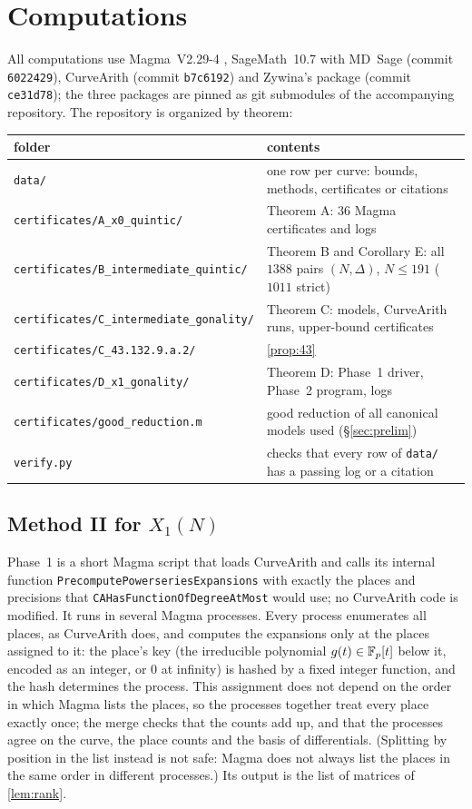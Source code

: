 \section{Computations}\label{sec:computations}

All computations use Magma~V2.29-4 \cite{Magma}, SageMath~10.7 with MD~Sage \cite{MDSage} (commit
\texttt{6022429}), CurveArith \cite{DerickxTerao} (commit \texttt{b7c6192}) and Zywina's package
\cite{ZywinaModular} (commit \texttt{ce31d78}); the three packages are pinned as git submodules of the
accompanying repository. The repository is organized by theorem:
\begin{center}\small
\begin{tabular}{lp{}}\toprule
folder & contents\\\midrule
\texttt{data/} & one row per curve: bounds, methods, certificates or citations\\
\texttt{certificates/A\_x0\_quintic/} & Theorem A: $36$ Magma certificates and logs\\
\texttt{certificates/B\_intermediate\_quintic/} & Theorem B and Corollary E: all $1388$ pairs $(N,\Delta)$, $N\le191$ ($1011$ strict)\\
\texttt{certificates/C\_intermediate\_gonality/} & Theorem C: models, CurveArith runs, upper-bound certificates\\
\texttt{certificates/C\_43.132.9.a.2/} & \cref{prop:43}\\
\texttt{certificates/D\_x1\_gonality/} & Theorem D: Phase~1 driver, Phase~2 program, logs\\
\texttt{certificates/good\_reduction.m} & good reduction of all canonical models used (\S\ref{sec:prelim})\\
\texttt{verify.py} & checks that every row of \texttt{data/} has a passing log or a citation\\\bottomrule
\end{tabular}
\end{center}

\subsection*{Method II for \texorpdfstring{$X_1(N)$}{X1(N)}}
Phase~1 is a short Magma script that loads CurveArith and calls its internal function
\texttt{PrecomputePowerseriesExpansions} with exactly the places and precisions that
\texttt{CAHasFunctionOfDegreeAtMost} would use; no CurveArith code is modified. It runs in several Magma processes. Every
process enumerates all places, as CurveArith does, and computes the expansions only at the places assigned to it: the
place's key (the irreducible polynomial $g(t)\in\mathbb{F}_p[t]$ below it, encoded as an integer, or $0$ at infinity) is
hashed by a fixed integer function, and the hash determines the process. This assignment does not depend on the order in which Magma lists the places, so
the processes together treat every place exactly once; the merge checks that the counts add up, and that the
processes agree on the curve, the place counts and the basis of differentials. (Splitting by position in the list
instead is not safe: Magma does not always list the places in the same order in different processes.) Its
output is the list of matrices of \cref{lem:rank}.

